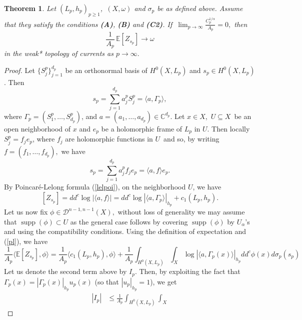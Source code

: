 \documentclass[11pt,leqno,oneside]{amsart}
\newtheorem{thm}{Theorem}[section]
\numberwithin{equation}{section}
\begin{document}
\begin{thm}\label{exdist1}
	 Let $(L_{p}, h_{p})_{p\geq 1}$,\, $(X, \omega)$ and $\sigma_{p}$  be as defined above. Assume that they  satisfy the conditions \textbf{(A)}, \textbf{(B)} and \textbf{(C2)}. If $\ \lim_{p\rightarrow \infty}\frac{C_{p}^{1/\alpha}}{A_{p}}=0,$ then
	\begin{equation}
		\frac{1}{A_{p}}\,\mathbb{E}[Z_{s_{p}}]\longrightarrow \omega
	\end{equation}
	in the weak* topology of currents as $p\rightarrow \infty.$
\end{thm}
\begin{proof}
	Let $\{S^{p}_{j}\}_{j = 1}^{d_{p}}$ be an orthonormal basis of $H^{0}(X, L_{p})$ and $s_{p}\in H^{0}(X, L_{p})$. Then $$s_{p}=\sum_{j=1}^{d_{p}}{a_{j}^{p}S^{p}_{j}}=\langle a, \Gamma_{p} \rangle,$$ where $\Gamma_{p}=(S_{1}^{p}, \ldots, S^{p}_{d_{p}})$, and $a=(a_{1}, \ldots, a_{d_{p}})\in \mathbb{C}^{d_{p}}$. Let $x\in X$,\, $U\subseteq X$ \,be an open neighborhood of $x$ and $e_{p}$ be a holomorphic frame of $L_{p}$ in $U$. Then locally $S^{p}_{j}=f_{j}e_{p}$, where $f_{j}$ are holomorphic functions in $U$\, and so, by writing $f=(f_{1}, \ldots, f_{d_{p}}),$ we have $$s_{p}=\sum_{j=1}^{d_{p}}{a_{j}^{p}f_{j}e_{p}}=\langle a, f \rangle e_{p}.$$ By Poincar\'{e}-Lelong formula (\ref{lelpoi}), on the neighborhood $U$, we have
	\begin{equation}\label{pl}
		[Z_{s_{p}}]=dd^{c}\log{|\langle a, f \rangle|}= dd^{c}\log|\langle a, \Gamma_{p}\rangle|_{h_{p}}+c_{1}(L_{p}, h_{p}).
	\end{equation}
	 Let us now fix $\phi \in \mathcal{D}^{n-1, n-1}(X),$  without loss of generality we may assume that $\operatorname{supp}(\phi)\subset U$ as the general case follows by covering $\operatorname{supp}(\phi)$ by $U_{\alpha}$'s and using the compatibility conditions. Using the  definition of expectation and (\ref{pl}), we have
	\begin{equation} \label{Ip}
		\frac{1}{A_{p}}\langle \mathbb{E}[Z_{s_{p}}], \phi \rangle=	\frac{1}{A_{p}}\langle c_{1}(L_{p}, h_{p}), \phi \rangle + 	\frac{1}{A_{p}}  \int_{H^{0}(X, L_{p})}\int_{X}{\log{| \langle a, \Gamma_{p}(x)\rangle|_{h_{p}}}}dd^{c}\phi(x)d\sigma_{p}(s_{p})
	\end{equation}
	Let us denote the second term above by $I_{p}$. Then, by exploiting the fact that $\Gamma_{p}(x)=|\Gamma_{p}(x)|_{h_{p}}u_{p}(x)$ (so that $|u_{p}|_{h_{p}}=1$), we get
	\begin{align}\label{cd1}
|I_p|
&\le \frac{1}{A_p}\int_{H^{0}(X,L_p)}\int_X

\end{align}
\end{proof}
\end{document}
